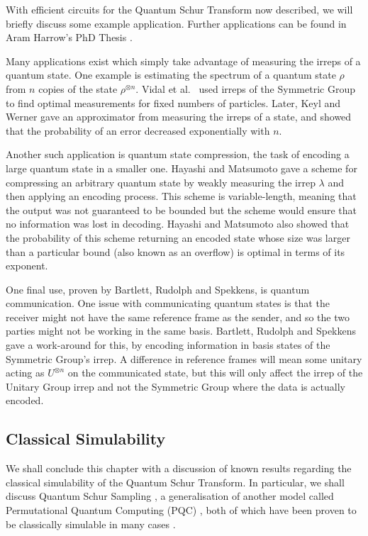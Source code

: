 With efficient circuits for the Quantum Schur Transform now described, we will briefly discuss some example application. Further applications can be found in Aram Harrow's PhD Thesis \cite{harrow2005}.

Many applications exist which simply take advantage of measuring the irreps of a quantum state. One example is estimating the spectrum of a quantum state $\rho$ from $n$ copies of the state $\rho^{\otimes n}$. Vidal et al.~\cite{vidal1999} used irreps of the Symmetric Group to find optimal measurements for fixed numbers of particles. Later, Keyl and Werner \cite{keyl2001} gave an approximator from measuring the irreps of a state, and showed that the probability of an error decreased exponentially with $n$.

Another such application is quantum state compression, the task of encoding a large quantum state in a smaller one. Hayashi and Matsumoto \cite{hayashi2002, hayashi2002simple} gave a scheme for compressing an arbitrary quantum state by weakly measuring the irrep $\lambda$ and then applying an encoding process. This scheme is variable-length, meaning that the output was not guaranteed to be bounded but the scheme would ensure that no information was lost in decoding. Hayashi and Matsumoto also showed that the probability of this scheme returning an encoded state whose size was larger than a particular bound (also known as an overflow) is optimal in terms of its exponent.

One final use, proven by Bartlett, Rudolph and Spekkens\cite{bartlett2001}, is quantum communication. One issue with communicating quantum states is that the receiver might not have the same reference frame as the sender, and so the two parties might not be working in the same basis. Bartlett, Rudolph and Spekkens gave a work-around for this, by encoding information in basis states of the Symmetric Group's irrep. A difference in reference frames will mean some unitary acting as $U^{\otimes n}$ on the communicated state, but this will only affect the irrep of the Unitary Group irrep and not the Symmetric Group where the data is actually encoded.

\subsection{Classical Simulability}

We shall conclude this chapter with a discussion of known results regarding the classical simulability of the Quantum Schur Transform. In particular, we shall discuss Quantum Schur Sampling \cite{havlicek2018}, a generalisation of another model called Permutational Quantum Computing (PQC) \cite{jordan2010}, both of which have been proven to be classically simulable in many cases \cite{havlicek2019}.

